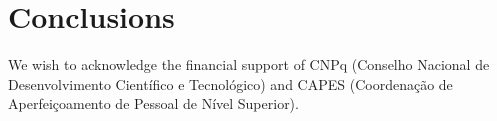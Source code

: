\documentclass[%
reprint,
superscriptaddress,
amsmath,amssymb,
aps,
pra,
]{revtex4-2}
\begin{document}
\section{Conclusions}


 











\begin{acknowledgments}
We wish to acknowledge the financial support of CNPq (Conselho Nacional de Desenvolvimento Cient\'ifico e Tecnol\'ogico) and CAPES (Coordenação de Aperfeiçoamento de Pessoal de Nível Superior). 
\end{acknowledgments}

\appendix



\end{document}
